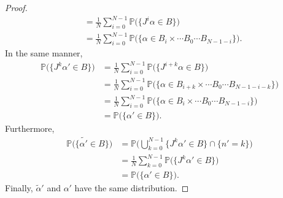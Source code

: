 \documentclass[numbers,compress,v1.0.1]{vmsta}
\theoremstyle{definition}
\begin{document}
\begin{proof}
\begin{align*}
&=\frac{1}{N}\sum_{i=0}^{N-1}
\mathbb{P}\bigl(\bigl\lbrace J^i\alpha\in B\bigr\rbrace\bigr)
\\
&=\frac{1}{N}\sum_{i=0}^{N-1}
\mathbb{P}\bigl(\lbrace\alpha\in B_i\times \cdots B_0
\cdots B_{N-1-i}\rbrace\bigr).
\end{align*}
%
In the same manner,
%
\begin{align*}
\mathbb{P}\bigl(\bigl\lbrace J^k\alpha'\in B\bigr
\rbrace\bigr)&=\frac{1}{N}\sum_{i=0}^{N-1}
\mathbb{P}\bigl(\bigl\lbrace J^{i+k}\alpha\in B\bigr\rbrace\bigr)
\\
&=\frac{1}{N}\sum_{i=0}^{N-1}
\mathbb{P}\bigl(\lbrace\alpha\in B_{i+k}\times \cdots B_0
\cdots B_{N-1-i-k}\rbrace\bigr)
\\
&=\frac{1}{N}\sum_{i=0}^{N-1}
\mathbb{P}\bigl(\lbrace\alpha\in B_i\times \cdots B_0
\cdots B_{N-1-i}\rbrace\bigr)
\\
&=\mathbb{P}\bigl(\bigl\lbrace\alpha'\in B\bigr\rbrace\bigr).
\end{align*}
%
Furthermore,
%
\begin{align*}
\mathbb{P}\bigl(\bigl\lbrace\tilde{\alpha'}\in B\bigr\rbrace
\bigr)&=\mathbb{P}\Biggl(\bigcup_{k=0}^{N-1}
\bigl\lbrace J^k\alpha'\in B\bigr\rbrace\cap\bigl\lbrace
n'=k\bigr\rbrace\Biggr)
\\
&=\frac{1}{N}\sum_{k=0}^{N-1}
\mathbb{P}\bigl(\bigl\lbrace J^k\alpha'\in B\bigr\rbrace
\bigr)
\\
&=\mathbb{P}\bigl(\bigl\lbrace\alpha'\in B\bigr\rbrace\bigr).
\end{align*}
%
Finally, $\tilde{\alpha}'$ and $\alpha'$ have the same distribution.
\end{proof}
\end{document}
